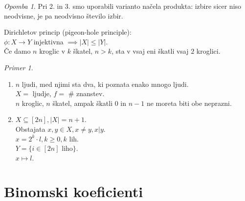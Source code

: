 \documentclass[a4paper, 12pt]{book}
\theoremstyle{definition}
\theoremstyle{remark}
\newtheorem*{ex}{Primer}
\newtheorem*{rem}{Opomba}
\begin{document}
\begin{rem}
  Pri 2. in 3. smo uporabili varianto načela produkta: izbire sicer niso neodvisne, je pa neodvisno število izbir.
\end{rem}
Dirichletov princip (pigeon-hole principle): \\
$\phi: X \to Y$ injektivna $\implies |X| \leq |Y|$. \\
Če damo $n$ kroglic v $k$ škatel, $n > k$, sta v vsaj eni škatli vsaj $2$ kroglici.
\begin{ex} \text{}
  \begin{enumerate}[label=(\arabic{*})]
    \item $n$ ljudi, med njimi sta dva, ki poznata enako mnogo ljudi. \\
      $X =$ ljudje, $f=$ \# znanstev. \\
      $n$ kroglic, $n$ škatel, ampak škatli $0$ in $n-1$ ne moreta biti obe neprazni.
    \item $X \subseteq [2n], |X| = n+1$. \\
      Obstajata $x,y \in X, x \neq y, x|y$. \\
      $x = 2^k \cdot l, k \geq 0, k$ lih. \\
      $Y = \{i \in [2n]$ liho$\}$. \\
      $x \mapsto l$.
  \end{enumerate}
\end{ex}


\section{Binomski koeficienti}
\end{document}
